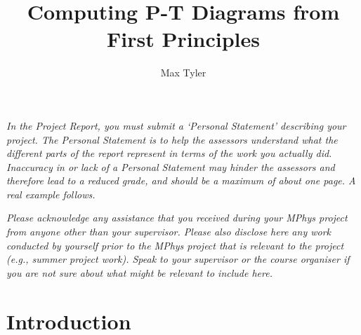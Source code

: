 \documentclass[12pt]{article}
\begin{document}
\title{Computing P-T Diagrams from First Principles} %
\author{Max Tyler} %

\begin{abstract}
\end{abstract}

\maketitle

\personalstatement

\textit{In the Project Report, you must submit a `Personal Statement' describing your project. The Personal Statement is to help the assessors understand what the different parts of the report represent in terms of the work you actually did. Inaccuracy in or lack of a Personal Statement may hinder the assessors and therefore lead to a reduced grade, and should be a maximum of about one page.  A real example follows.}

\acknowledgments

\textit{Please acknowledge any assistance that you received during your MPhys project from anyone other than your supervisor. Please also disclose here any work conducted by yourself prior to the MPhys project that is relevant to the project (e.g., summer project work). Speak to your supervisor or the course organiser if you are not sure about what might be relevant to include here.}

\maintext


\section{Introduction}
\end{document}
